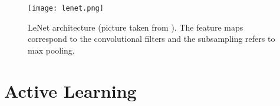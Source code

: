 \begin{figure}[H]
    \centering
    \texttt{[image: lenet.png]}
    \caption{LeNet architecture (picture taken from \cite{lecun1998gradient}). The feature maps correspond to the convolutional filters and the subsampling refers to max pooling.}
    \label{fig:lenet_architecture}
\end{figure}




\section{Active Learning}
